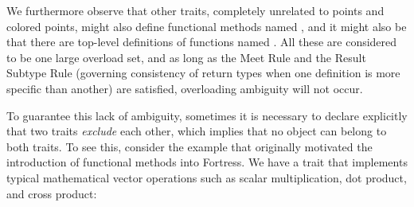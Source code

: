 We furthermore observe that other traits, completely unrelated to points
and colored points, might also define functional methods
named , and it might also be that there are top-level
definitions of functions named .  All these are considered
to be one large overload set, and as long as the Meet Rule
and the Result Subtype Rule (governing consistency of return types
when one definition is more specific than another) are satisfied,
overloading ambiguity will not occur.

To guarantee this lack of ambiguity, sometimes it is necessary
to declare explicitly that two traits \emph{exclude} each other,
which implies that no object can belong to both traits.
To see this, consider the example that originally motivated
the introduction of functional methods into Fortress.
We have a  trait that implements typical mathematical vector operations
such as scalar multiplication, dot product, and cross product:
